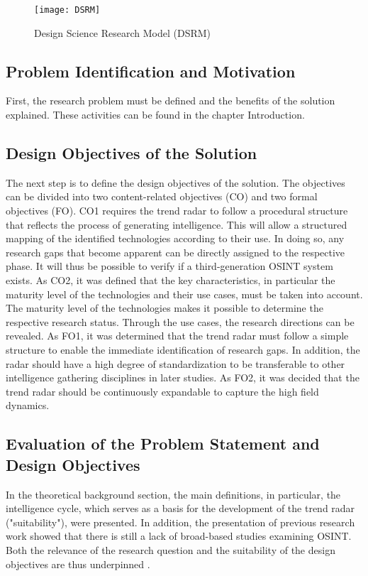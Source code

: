 \documentclass[10pt]{article}
\begin{document}
\begin{figure*}[thb]
    \centering
    \texttt{[image: DSRM]}
    \caption{Design Science Research Model (DSRM)}
    \label{fig: DSRM}
\end{figure*}

\subsection{Problem Identification and Motivation}

First, the research problem must be defined and the benefits of the solution explained.
These activities can be found in the chapter Introduction.

\subsection{Design Objectives of the Solution}

The next step is to define the design objectives of the solution. The
objectives can be divided into two content-related objectives (CO) and
two formal objectives (FO). CO1 requires the trend radar to follow a procedural
structure that reflects the process of generating intelligence. This will allow a structured mapping of the
identified technologies according to their use. In doing so, any
research gaps that become apparent can be directly assigned to the
respective phase. It will thus be possible to verify if a third-generation OSINT system exists. As CO2, it was defined that the key
characteristics, in particular the maturity level of the technologies
and their use cases, must be taken into account. The maturity level of
the technologies makes it possible to determine the respective research status.
Through the use cases, the research directions can be
revealed. As FO1, it was determined that the trend radar must follow
a simple structure to enable the immediate identification of research gaps. In addition,
the radar should have a high degree of standardization to be
transferable to other intelligence gathering disciplines in later
studies. As FO2, it was decided that the trend radar should be continuously expandable to capture the high field dynamics.

\subsection{Evaluation of the Problem Statement and Design Objectives}

In the theoretical background section, the main definitions, in
particular, the intelligence cycle, which serves as a basis for the
development of the trend radar ("suitability"), were presented. In
addition, the presentation of previous research work showed that there
is still a lack of broad-based studies examining OSINT. Both the
relevance of the research question and the suitability of the
design objectives are thus underpinned \cite{Sonnenberg.2012}.
\end{document}

